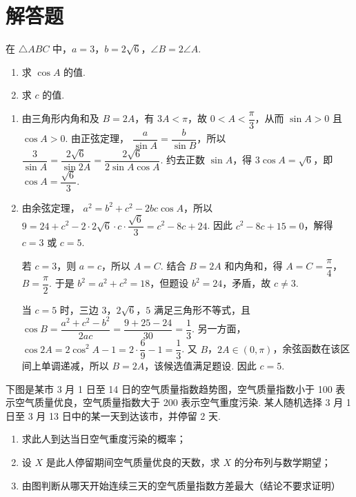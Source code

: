 \section{解答题}

\begin{problem}
在 \(\triangle ABC\) 中，\(a = 3\)，\(b = 2\sqrt{6}\)，\(\angle B = 2\angle A\).
\begin{enumerate}
\item 求 \( \cos A \) 的值.
\item 求 \(c\) 的值.
\end{enumerate}
\end{problem}

\begin{solution}
\begin{enumerate}
\item 由三角形内角和及 \(B=2A\)，有 \(3A<\pi\)，故 \(0<A<\dfrac{\pi}{3}\)，从而 \(\sin A>0\) 且 \(\cos A>0\). 由正弦定理，
\(\dfrac{a}{\sin A}=\dfrac{b}{\sin B}\)，所以
\(\dfrac{3}{\sin A}=\dfrac{2\sqrt6}{\sin2A}=\dfrac{2\sqrt6}{2\sin A\cos A}\). 约去正数 \(\sin A\)，得 \(3\cos A=\sqrt6\)，即 \(\cos A=\dfrac{\sqrt6}{3}\).

\item 由余弦定理，
\(a^2=b^2+c^2-2bc\cos A\)，所以
\(9=24+c^2-2\cdot2\sqrt6\cdot c\cdot\dfrac{\sqrt6}{3}=c^2-8c+24\). 因此
\(c^2-8c+15=0\)，解得 \(c=3\) 或 \(c=5\).

若 \(c=3\)，则 \(a=c\)，所以 \(A=C\). 结合 \(B=2A\) 和内角和，得 \(A=C=\dfrac{\pi}{4}\)，\(B=\dfrac{\pi}{2}\). 于是 \(b^2=a^2+c^2=18\)，但题设 \(b^2=24\)，矛盾，故 \(c\ne3\).

当 \(c=5\) 时，三边 \(3\)，\(2\sqrt6\)，\(5\) 满足三角形不等式，且
\(\cos B=\dfrac{a^2+c^2-b^2}{2ac}=\dfrac{9+25-24}{30}=\dfrac13\). 另一方面，
\(\cos2A=2\cos^2A-1=2\cdot\dfrac{6}{9}-1=\dfrac13\). 又 \(B\)，\(2A\in(0,\pi)\)，余弦函数在该区间上单调递减，所以 \(B=2A\)，该候选值满足题设. 因此 \(c=5\).
\end{enumerate}
\end{solution}

\begin{problem}
下图是某市 3 月 1 日至 14 日的空气质量指数趋势图，空气质量指数小于 100 表示空气质量优良，空气质量指数大于 200 表示空气重度污染. 某人随机选择 3 月 1 日至 3 月 13 日中的某一天到达该市，并停留 2 天.

\begin{enumerate}
\item 求此人到达当日空气重度污染的概率；
\item 设 \(X\) 是此人停留期间空气质量优良的天数，求 \(X\) 的分布列与数学期望；
\item 由图判断从哪天开始连续三天的空气质量指数方差最大（结论不要求证明）
\end{enumerate}

\end{problem}


